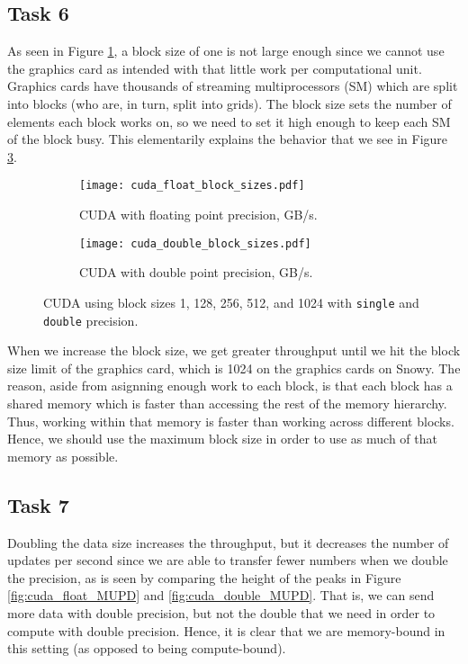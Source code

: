 \documentclass[10pt]{article}
\begin{document}
\subsection{Task 6}
As seen in Figure \ref{fig:cuda_float_GBs}, a block size of one is not large enough since we cannot use the graphics card as intended with that little work per computational unit. Graphics cards have thousands of streaming multiprocessors (SM) which are split into blocks (who are, in turn, split into grids). The block size sets the number of elements each block works on, so we need to set it high enough to keep each SM of the block busy. This elementarily explains the behavior that we see in Figure \ref{fig:single_and_double_cuda_GBs}.
\begin{figure}[H]
    \centering
    \begin{subfigure}[b]{0.49\textwidth}
        \centering
        \texttt{[image: cuda\_float\_block\_sizes.pdf]}
        \caption{CUDA with floating point precision, GB/s.}
        \label{fig:cuda_float_GBs}
    \end{subfigure}\hfill
    \begin{subfigure}[b]{0.49\textwidth}
        \centering
        \texttt{[image: cuda\_double\_block\_sizes.pdf]}
        \caption{CUDA with double point precision, GB/s.}
        \label{fig:cuda_double_GBs}
    \end{subfigure}\hfill
    \caption{CUDA using block sizes 1, 128, 256, 512, and 1024 with \texttt{single} and \texttt{double} precision.}
    \label{fig:single_and_double_cuda_GBs}
\end{figure}
When we increase the block size, we get greater throughput until we hit the block size limit of the graphics card, which is 1024 on the graphics cards on Snowy. The reason, aside from asignning enough work to each block, is that each block has a shared memory which is faster than accessing the rest of the memory hierarchy. Thus, working within that memory is faster than working across different blocks. Hence, we should use the maximum block size in order to use as much of that memory as possible.
\subsection{Task 7}
Doubling the data size increases the throughput, but it decreases the number of updates per second since we are able to transfer fewer numbers when we double the precision, as is seen by comparing the height of the peaks in Figure \ref{fig:cuda_float_MUPD} and \ref{fig:cuda_double_MUPD}. That is, we can send more data with double precision, but not the double that we need in order to compute with double precision. Hence, it is clear that we are memory-bound in this setting (as opposed to being compute-bound). \\
\end{document}
